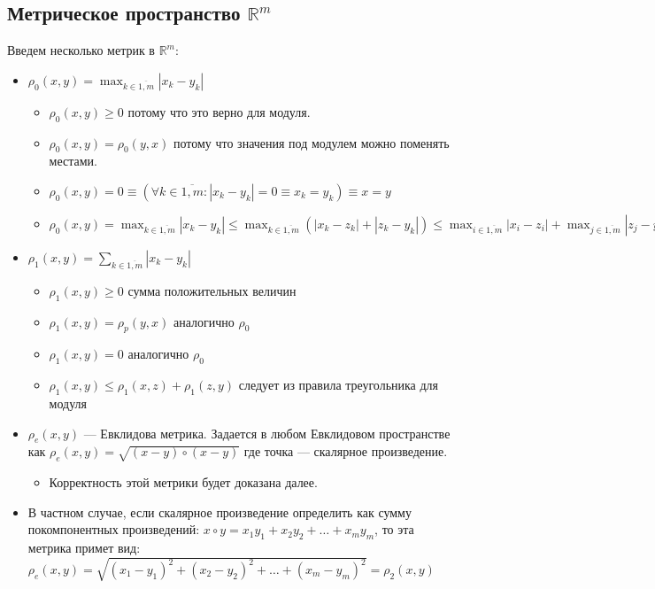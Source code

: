 \subsection{Метрическое пространство $\mathbb{R}^m$}
Введем несколько метрик в $\mathbb{R}^m$:
\begin{itemize}
    \item $\rho_0(x, y) = \max_{k \in \overline{1, m}} |x_k - y_k|$
    \begin{itemize}
        \item $\rho_0(x, y) \geq 0$ потому что это верно для модуля.
        \item $\rho_0(x,y) = \rho_0(y, x)$ потому что значения под модулем можно поменять местами.
        \item $\rho_0(x, y) = 0 \equiv
        (\forall k \in \overline{1, m} : |x_k - y_k| = 0 \equiv x_k = y_k)
        \equiv x = y$
        \item $\rho_0(x, y) = 
        \max_{k \in \overline{1, m}} |x_k - y_k| \leq
        \max_{k \in \overline{1, m}}
        (|x_k - z_k| + |z_k - y_k|) \leq
        \max_{i \in \overline{1, m}} |x_i - z_i| + 
        \max_{j \in \overline{1, m}} |z_j - y_j| =
        \rho_0(x, z) + \rho_0(z, y)$
    \end{itemize}
    \item $\rho_1(x, y) = \sum_{k \in \overline{1, m}} |x_k - y_k|$
    \begin{itemize}
        \item $\rho_1(x, y) \geq 0$ сумма положительных величин
        \item $\rho_1(x,y) = \rho_p(y, x)$ аналогично $\rho_0$
        \item $\rho_1(x, y) = 0$ аналогично $\rho_0$
        \item $\rho_1(x, y) \leq \rho_1(x, z) + \rho_1(z, y)$ следует из правила треугольника для модуля
    \end{itemize}
    \item $\rho_e(x, y)$ --- Евклидова метрика. Задается в любом Евклидовом пространстве как $\rho_e(x, y) = \sqrt{(x-y) \circ (x-y)}$ где точка --- скалярное произведение.
    \begin{itemize}
        \item Корректность этой метрики будет доказана далее.
    \end{itemize}
    \item В частном случае, если скалярное произведение определить как сумму покомпонентных произведений: $x \circ y = x_1y_1 + x_2y_2 + \dots + x_my_m$, то эта метрика примет вид: $\rho_e(x, y) = \sqrt{(x_1 - y_1)^2 + (x_2 - y_2)^2 + \dots + (x_m - y_m)^2} = \rho_2(x, y)$
\end{itemize}
